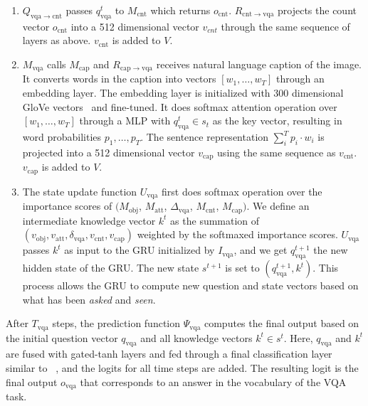 \documentclass{article}
\def\Mobj{M_\mathrm{obj}}
\def\Matt{M_\mathrm{att}}
\def\Mcnt{M_\mathrm{cnt}}
\def\Mcap{M_\mathrm{cap}}
\def\Mvqa{M_\mathrm{vqa}}
\begin{document}
\begin{enumerate}[\hspace{0pt}(1)]
\item{
$Q_{\mathrm{vqa}\rightarrow \mathrm{cnt}}$ passes $q_\mathrm{vqa}^t$ to $\Mcnt$ which returns $o_\mathrm{cnt}$.
$R_{\mathrm{cnt}\rightarrow\mathrm{vqa}}$ projects the count vector $o_\mathrm{cnt}$ into a 512 dimensional vector $v_{cnt}$ through the same sequence of layers as above.
$v_\mathrm{cnt}$ is added to $V$.
} 

\item{
$\Mvqa$ calls  $\Mcap$ and
$R_{\mathrm{cap}\rightarrow\mathrm{vqa}}$ receives natural language caption of the image.
It converts words in the caption into vectors $[w_1,\ldots,w_T]$ through an embedding layer.
The embedding layer is initialized with 300 dimensional GloVe vectors~\citep{pennington14} and fine-tuned.
It does softmax attention operation over $[w_1,\ldots,w_T]$ through a MLP with $q_{\mathrm{vqa}}^t \in s_t$ as the key vector, resulting in word probabilities $p_1,\ldots,p_T$.
The sentence representation $\sum_{i}^{T} p_i \cdot w_i$ is projected into a 512 dimensional vector $v_\mathrm{cap}$ using the same sequence as $v_\mathrm{cnt}$. $v_\mathrm{cap}$ is added to $V$.
} 

\item{
The state update function $U_\mathrm{vqa}$ first does softmax operation over the importance scores of $(\Mobj$, $\Matt$, $\Delta_\mathrm{vqa}$, $\Mcnt$, $\Mcap)$.
We define an intermediate knowledge vector $k^t$ as the summation of $(v_\mathrm{obj}, v_\mathrm{att}, \delta_\mathrm{vqa}, v_\mathrm{cnt}, v_\mathrm{cap})$ weighted by the softmaxed importance scores.
$U_\mathrm{vqa}$ passes $k^t$ as input to the GRU initialized by $I_\mathrm{vqa}$, and we get $q_\mathrm{vqa}^{t+1}$ the new hidden state of the GRU.
The new state $s^{t+1}$ is set to $(q_\mathrm{vqa}^{t+1}, k^t)$.
This process allows the GRU to compute new question and state vectors based on what has been \emph{asked} and \emph{seen}.
} 
\end{enumerate}
After $T_{\mathrm{vqa}}$ steps, the prediction function $\Psi_\mathrm{vqa}$ computes the final output based on the initial question vector $q_\mathrm{vqa}$ and all knowledge vectors $k^t \in s^t$.
Here, $q_\mathrm{vqa}$ and $k^t$ are fused with gated-tanh layers and fed through a final classification layer similar to ~\citet{anderson17}, and the logits for all time steps are added.
The resulting logit is the final output $o_\mathrm{vqa}$ that corresponds to an answer in the vocabulary of the VQA task.
\end{document}

